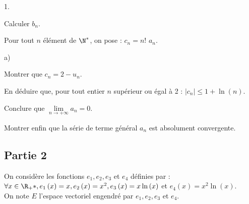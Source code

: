 \documentclass[11pt]{article}%
\begin{document}
\begin{noliste}{1.}
\item Calculer $b_{n}.$

\item Pour tout $n$ élément de $\N^{\ast }$, on pose : $c_{n} = n!$
$a_{n}.$

\begin{noliste}{a)}
 \setlength{\itemsep}{2mm}
\item Montrer que $c_{n} = 2-u_{n}.$

\item En déduire que, pour tout entier $n$ supérieur ou égal 
à 2 : $\left| c_{n}\right| \leq 1 + \ln \left( n\right).$

\item Conclure que $\lim \limits_{n\rightarrow + \infty }a_{n} = 0.$

\item Montrer enfin que la série de terme général $a_{n}$ est
absolument convergente.
\end{noliste}
\end{noliste}

\subsection*{Partie 2}

On considère les fonctions $e_{1},e_{2},e_{3}$ et $e_{4}$ définies
par :\\
$\forall x\in \R_{+}{\ast },e_{1}\left( x\right) = x,e_{2}\left(
x\right) = x^{2},e_{3}\left( x\right) = x\ln \left( x\right) $ et
$e_{4}\left(
x\right) = x^{2}\ln \left( x\right).$\\
On note $E$ l'espace vectoriel engendré par $e_{1},e_{2},e_{3}$ et
$e_{4}.$
\end{document}
